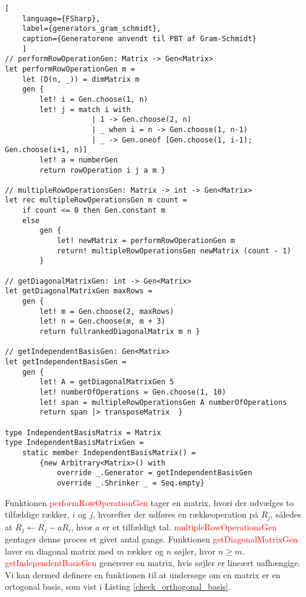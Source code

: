 \begin{lstlisting}[
    language={FSharp}, 
    label={generators_gram_schmidt}, 
    caption={Generatorene anvendt til PBT af Gram-Schmidt}
    ]
// performRowOperationGen: Matrix -> Gen<Matrix>
let performRowOperationGen m =
    let (D(n, _)) = dimMatrix m
    gen { 
        let! i = Gen.choose(1, n)
        let! j = match i with
                    | 1 -> Gen.choose(2, n)
                    | _ when i = n -> Gen.choose(1, n-1)
                    | _ -> Gen.oneof [Gen.choose(1, i-1); Gen.choose(i+1, n)]
        let! a = numberGen
        return rowOperation i j a m }

// multipleRowOperationsGen: Matrix -> int -> Gen<Matrix>
let rec multipleRowOperationsGen m count =
    if count <= 0 then Gen.constant m
    else
        gen {
            let! newMatrix = performRowOperationGen m
            return! multipleRowOperationsGen newMatrix (count - 1)
        }

// getDiagonalMatrixGen: int -> Gen<Matrix>
let getDiagonalMatrixGen maxRows =
    gen { 
        let! m = Gen.choose(2, maxRows)
        let! n = Gen.choose(m, m + 3)   
        return fullrankedDiagonalMatrix m n }
        
// getIndependentBasisGen: Gen<Matrix>
let getIndependentBasisGen =
    gen { 
        let! A = getDiagonalMatrixGen 5
        let! numberOfOperations = Gen.choose(1, 10)
        let! span = multipleRowOperationsGen A numberOfOperations
        return span |> transposeMatrix  }

type IndependentBasisMatrix = Matrix
type IndependentBasisMatrixGen =
    static member IndependentBasisMatrix() =
        {new Arbitrary<Matrix>() with 
            override _.Generator = getIndependentBasisGen
            override _.Shrinker _ = Seq.empty}
\end{lstlisting}

Funktionen \textcolor{red}{performRowOperationGen} tager en matrix, hvori der udvælges to tilfældige rækker, \(i\) og \(j\), hvorefter der udføres en rækkeoperation på \(R_j\), således at \(R_j \leftarrow R_j - aR_i\), hvor \(a\) er et tilfældigt tal. \textcolor{red}{multipleRowOperationsGen} gentager denne proces et givet antal gange. Funktionen \textcolor{red}{getDiagonalMatrixGen} laver en diagonal matrix med \(m\) rækker og \(n\) søjler, hvor \(n \geq m\). \textcolor{red}{getIndependentBasisGen} genererer en matrix, hvis søjler er lineært uafhængige. Vi kan dermed definere en funktionen til at undersøge om en matrix er en ortogonal basis, som vist i Listing \ref{check_orthogonal_basis}.

